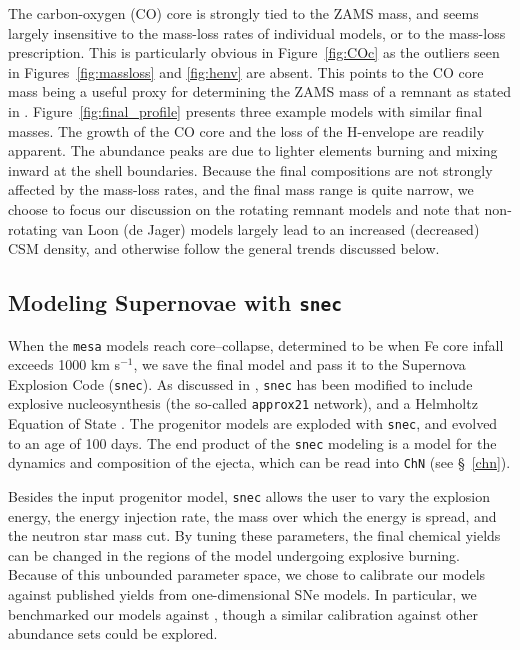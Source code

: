 \documentclass[twocolumn]{aastex631}
\begin{document}
The carbon-oxygen (CO) core is strongly tied to the ZAMS mass, and seems largely insensitive to the mass-loss rates of individual models, or to the mass-loss prescription. This is particularly obvious in Figure~\ref{fig:COc} as the outliers seen in Figures~\ref{fig:massloss} and \ref{fig:henv} are absent. This points to the CO core mass being a useful proxy for determining the ZAMS mass of a remnant as stated in \citet{katsuda}. 
Figure~\ref{fig:final_profile} presents three example models with similar final masses. The growth of the CO core and the loss of the H-envelope are readily apparent. The abundance peaks are due to lighter elements burning and mixing inward at the shell boundaries. Because the final compositions are not strongly affected by the mass-loss rates, and the final mass range is quite narrow, we choose to focus our discussion on the rotating remnant models and note that non-rotating van Loon (de Jager) models largely lead to an increased (decreased) CSM density, and otherwise follow the general trends discussed below.

\subsection{Modeling Supernovae with \texttt{snec}}
\label{snec}

When the \texttt{mesa} models reach core--collapse, determined to be when Fe core infall exceeds 1000 km s$^{-1}$, 
we save the final model and pass it to the Supernova Explosion Code (\texttt{snec}). As discussed in 
\citet{pat17}, \texttt{snec} \citep{moro1} has been modified to include explosive nucleosynthesis (the so-called
\texttt{approx21} network), and a Helmholtz Equation of State \citep{timmes00}. The progenitor models are
exploded with \texttt{snec}, and evolved to an age of 100 days. The end product of the \texttt{snec} modeling is a model for the dynamics and composition of the ejecta, which can be read into \texttt{ChN} (see \S~\ref{chn}). 

Besides the input progenitor model, \texttt{snec} allows the user to vary the explosion energy, the energy injection rate, the mass over which the energy is spread, and the neutron star mass cut. By tuning these parameters, the final chemical yields can be changed in the regions of the model undergoing explosive burning. Because of this unbounded parameter space, we chose to calibrate our models against published yields from one-dimensional SNe models. In particular, we benchmarked our models against \citet[][hereafter YF07]{YF07}, though a similar calibration against other abundance sets could be explored. 
\end{document}
